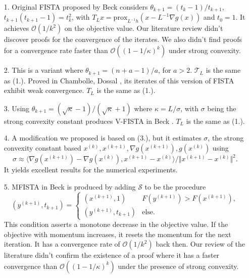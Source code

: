 \documentclass[]{article}
\theoremstyle{definition}
\numberwithin{equation}{subsection}
\begin{document}
        \begin{itemize}
            \item [1.] 
                Original FISTA proposed by Beck \cite{beck_fast_2009-1} considers $\theta_{k + 1} = (t_k - 1)/t_{k + 1}$, $t_{k + 1}(t_{k + 1} - 1) = t_{k}^2$, with $T_L x = \text{prox}_{L^{-1}h}(x  - L^{-1}\nabla g(x))$ and $t_0 = 1$. 
            It achieves $\mathcal O(1/k^2)$ on the objective value. 
            Our literature review didn't discover proofs for the convergence of the iterates. We also didn't find proofs for a convergence rate faster than $\mathcal O((1 - 1/\kappa)^k)$ under strong convexity. 
            \item [2.] 
                This is a variant where $\theta_{k + 1} = (n + a - 1)/a$, for $a > 2$. $\mathcal T_L$ is the same as (1.). 
            Proved in Chambolle, Dossal \cite{chambolle_convergence_2015}, its iterates of this version of FISTA exhibit weak convergence. $T_L$ is the same as (1.). 
            \item [3.] 
                Using $\theta_{k + 1} = (\sqrt{\kappa} - 1)/(\sqrt{\kappa} + 1)$ where $\kappa = L/\sigma$, with $\sigma$ being the strong convexity constant produces V-FISTA in Beck \cite[10.7.7]{beck_first-order_nodate}\cite[3.3]{noel_nesterovs_nodate}. $T_L$ is the same as (1.). 
            \item [4.] 
                A modification we proposed is based on (3.), but it estimates $\sigma$, the strong convexity constant based $x^{(k)}, x^{(k + 1)}, \nabla g(x^{(k + 1)}), g(x^{(k)})$ using 
                \[
                    \sigma \approx \langle \nabla g(x^{(k + 1)}) - \nabla g(x^{(k)}), x^{(k + 1)} - x^{(k)}\rangle/ 
                    \Vert x^{(k + 1)} - x^{(k)}\Vert^2. 
                \]
            It yields excellent results for the numerical experiments. 
            \item [5.] 
                MFISTA in Beck\cite{beck_fast_2009} is produced by adding $\mathcal S$ to be the procedure
                \[
                    (y^{(k + 1)}, t_{k + 1}) = \begin{cases}
                        (x^{(k + 1)}, 1) & F(y^{(k + 1)}) > F(x^{(k + 1)}),
                        \\
                        (y^{(k + 1)}, t_{k + 1}) & \text{else}. 
                    \end{cases}
                \]
                This condition asserts a monotone decrease in the objective value. If the objective with momentum increases, it resets the momentum for the next iteration.  It has a convergence rate of $\mathcal O(1/k^2)$ back then. Our review of the literature didn't confirm the existence of a proof where it has a faster convergence than $\mathcal O((1 - 1/\kappa)^k)$ under the presence of strong convexity. 
        \end{itemize}
\end{document}
